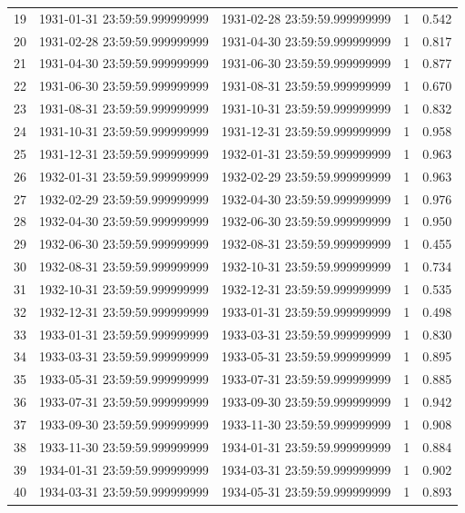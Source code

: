 \begin{table}
\begin{tabular}{lcccc}
19 & 1931-01-31 23:59:59.999999999 & 1931-02-28 23:59:59.999999999 & 1 & 0.542 \\
20 & 1931-02-28 23:59:59.999999999 & 1931-04-30 23:59:59.999999999 & 1 & 0.817 \\
21 & 1931-04-30 23:59:59.999999999 & 1931-06-30 23:59:59.999999999 & 1 & 0.877 \\
22 & 1931-06-30 23:59:59.999999999 & 1931-08-31 23:59:59.999999999 & 1 & 0.670 \\
23 & 1931-08-31 23:59:59.999999999 & 1931-10-31 23:59:59.999999999 & 1 & 0.832 \\
24 & 1931-10-31 23:59:59.999999999 & 1931-12-31 23:59:59.999999999 & 1 & 0.958 \\
25 & 1931-12-31 23:59:59.999999999 & 1932-01-31 23:59:59.999999999 & 1 & 0.963 \\
26 & 1932-01-31 23:59:59.999999999 & 1932-02-29 23:59:59.999999999 & 1 & 0.963 \\
27 & 1932-02-29 23:59:59.999999999 & 1932-04-30 23:59:59.999999999 & 1 & 0.976 \\
28 & 1932-04-30 23:59:59.999999999 & 1932-06-30 23:59:59.999999999 & 1 & 0.950 \\
29 & 1932-06-30 23:59:59.999999999 & 1932-08-31 23:59:59.999999999 & 1 & 0.455 \\
30 & 1932-08-31 23:59:59.999999999 & 1932-10-31 23:59:59.999999999 & 1 & 0.734 \\
31 & 1932-10-31 23:59:59.999999999 & 1932-12-31 23:59:59.999999999 & 1 & 0.535 \\
32 & 1932-12-31 23:59:59.999999999 & 1933-01-31 23:59:59.999999999 & 1 & 0.498 \\
33 & 1933-01-31 23:59:59.999999999 & 1933-03-31 23:59:59.999999999 & 1 & 0.830 \\
34 & 1933-03-31 23:59:59.999999999 & 1933-05-31 23:59:59.999999999 & 1 & 0.895 \\
35 & 1933-05-31 23:59:59.999999999 & 1933-07-31 23:59:59.999999999 & 1 & 0.885 \\
36 & 1933-07-31 23:59:59.999999999 & 1933-09-30 23:59:59.999999999 & 1 & 0.942 \\
37 & 1933-09-30 23:59:59.999999999 & 1933-11-30 23:59:59.999999999 & 1 & 0.908 \\
38 & 1933-11-30 23:59:59.999999999 & 1934-01-31 23:59:59.999999999 & 1 & 0.884 \\
39 & 1934-01-31 23:59:59.999999999 & 1934-03-31 23:59:59.999999999 & 1 & 0.902 \\
40 & 1934-03-31 23:59:59.999999999 & 1934-05-31 23:59:59.999999999 & 1 & 0.893 \\

\end{tabular}
\end{table}
